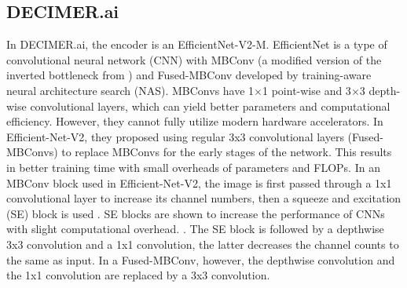 \documentclass[12pt]{article}
\begin{document}
\subsection{DECIMER.ai}
In DECIMER.ai, the encoder is an EfficientNet-V2-M. EfficientNet is a type of convolutional neural network (CNN) with MBConv \autocite{tan_efficientnet:_2020} (a modified version of the inverted bottleneck from \autocite{mobilenet}) and Fused-MBConv \autocite{suyog_efficientnet-edgetpu:_2019} developed by training-aware neural architecture search (NAS). \autocite{swin_tran} \autocite{effv2} MBConvs have 1$\times$1 point-wise and 3$\times$3 depth-wise convolutional layers, which can yield better parameters and computational efficiency. \autocite{mobilenet} \autocite{effv2} However, they cannot fully utilize modern hardware accelerators. In Efficient-Net-V2, they proposed using regular 3x3 convolutional layers (Fused-MBConvs) to replace MBConvs for the early stages of the network. This results in better training time with small overheads of parameters and FLOPs. In an MBConv block used in Efficient-Net-V2, the image is first passed through a 1x1 convolutional layer to increase its channel numbers, then a squeeze and excitation (SE) block is used \autocite{hu_squeeze-and-excitation_2019}\autocite{tan_efficientnet:_2020}. SE blocks are shown to increase the performance of CNNs with slight computational overhead. \autocite{hu_squeeze-and-excitation_2019}. The SE block is followed by a depthwise 3x3 convolution and a 1x1 convolution, the latter decreases the channel counts to the same as input. In a Fused-MBConv, however, the depthwise convolution and the 1x1 convolution are replaced by a 3x3 convolution. \autocite{effv2} \autocite{mobilenet}
\end{document}
